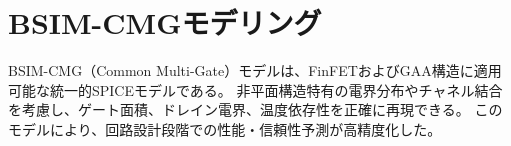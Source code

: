 \section{BSIM-CMGモデリング}
BSIM-CMG（Common Multi-Gate）モデルは、FinFETおよびGAA構造に適用可能な統一的SPICEモデルである。  
非平面構造特有の電界分布やチャネル結合を考慮し、ゲート面積、ドレイン電界、温度依存性を正確に再現できる。  
このモデルにより、回路設計段階での性能・信頼性予測が高精度化した。
